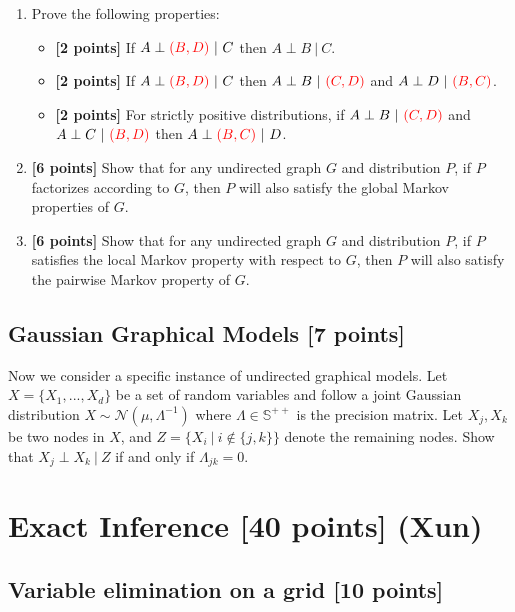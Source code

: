 \documentclass[12pt]{article}
\begin{document}
\begin{enumerate}
    \item Prove the following properties:
    \begin{itemize}
        \item \textbf{[2 points]} If $A \perp {\color{red} (B,D) } \ | \ C$ then $A \perp B \ | \ C$.
        \item \textbf{[2 points]} If $A \perp {\color{red} (B,D) } \ | \ C$ then $A \perp B \ | \ {\color{red} (C,D) }$ and $A \perp D \ | \ {\color{red} (B,C) }$.
        \item \textbf{[2 points]} For strictly positive distributions, if $A \perp B \ | \ {\color{red} (C,D) }$ and $A \perp C \ | \ {\color{red} (B,D) }$ then $A \perp {\color{red} (B,C) } \ | \ D$.
    \end{itemize}
    \item \textbf{[6 points]} Show that for any undirected graph $G$ and distribution $P$, if $P$ factorizes according to $G$, then $P$ will also satisfy the global Markov properties of $G$.
    \item \textbf{[6 points]} Show that for any undirected graph $G$ and distribution $P$, if $P$ satisfies the local Markov property with respect to $G$, then $P$ will also satisfy the pairwise Markov property of $G$.
\end{enumerate}

\subsection{Gaussian Graphical Models [7 points]}

Now we consider a specific instance of undirected graphical models. Let $X = \{ X_1, ..., X_d \}$ be a set of random variables and follow a joint Gaussian distribution $X \sim \mathcal{N}(\mu, \Lambda^{-1})$ where $\Lambda \in \mathbb{S}^{++}$ is the precision matrix. Let $X_j,X_k$ be two nodes in $X$, and $Z = \{X_i \ | \ i \notin \{j,k\}\}$ denote the remaining nodes. Show that $X_j \perp X_k \ | \ Z$ if and only if $\Lambda_{jk} = 0$.




\newpage

\section{Exact Inference [40 points] (Xun)}

\subsection{Variable elimination on a grid [10 points]}
\end{document}
